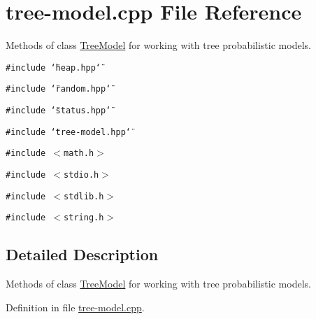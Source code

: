 \hypertarget{tree-model_8cpp}{
\section{tree-model.cpp File Reference}
\label{tree-model_8cpp}
}
Methods of class \hyperlink{class_tree_model}{Tree\-Model} for working with tree probabilistic models. 

{\tt \#include \char`\"{}heap.hpp\char`\"{}}\par
{\tt \#include \char`\"{}random.hpp\char`\"{}}\par
{\tt \#include \char`\"{}status.hpp\char`\"{}}\par
{\tt \#include \char`\"{}tree-model.hpp\char`\"{}}\par
{\tt \#include $<$math.h$>$}\par
{\tt \#include $<$stdio.h$>$}\par
{\tt \#include $<$stdlib.h$>$}\par
{\tt \#include $<$string.h$>$}\par


\subsection{Detailed Description}
Methods of class \hyperlink{class_tree_model}{Tree\-Model} for working with tree probabilistic models. 



Definition in file \hyperlink{tree-model_8cpp-source}{tree-model.cpp}.